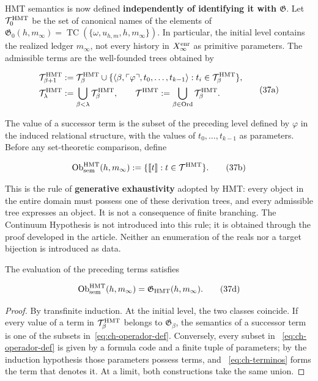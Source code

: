 HMT semantics is now defined \textbf{independently of identifying it with
\(\mathfrak G\)}. Let \(\mathcal T_0^{\rm HMT}\) be the set of canonical names
of the elements of
\(\mathfrak G_0(h,m_\infty)=
\operatorname{TC}(\{\omega,u_{h,m},h,m_\infty\})\). In particular, the
initial level contains the realized ledger \(m_\infty\), not every history
in \(X_\infty^{\rm enr}\) as primitive parameters. The admissible terms are
the well-founded trees obtained by

\[
 \begin{aligned}
 \mathcal T^{\rm HMT}_{\beta+1}
 &:={\mathcal T}^{\rm HMT}_\beta\cup
 \{\langle\beta,\ulcorner\varphi\urcorner,
       t_0,\ldots,t_{k-1}\rangle:
       t_i\in\mathcal T^{\rm HMT}_\beta\},\\
 \mathcal T^{\rm HMT}_\lambda&:=
       \bigcup_{\beta<\lambda}\mathcal T^{\rm HMT}_\beta,
 \qquad
 \mathcal T^{\rm HMT}:=
       \bigcup_{\beta\in\operatorname{Ord}}\mathcal T^{\rm HMT}_\beta.
 \end{aligned}
\tag{37a}\label{eq:ch-terminos}
\]

The value of a successor term is the subset of the preceding level defined by
\(\varphi\) in the induced relational structure, with the values of
\(t_0,\ldots,t_{k-1}\) as parameters. Before any set-theoretic comparison,
define

\[
 \operatorname{Ob}_{\rm sem}^{\rm HMT}(h,m_\infty)
 :=\{\llbracket t\rrbracket:t\in\mathcal T^{\rm HMT}\}.
\tag{37b}\label{eq:ch-objetos-semanticos}
\]

This is the rule of \textbf{generative exhaustivity} adopted by HMT: every
object in the entire domain must possess one of these derivation trees, and
every admissible tree expresses an object. It is not a consequence of finite
branching. The Continuum Hypothesis is not introduced into this rule; it is
obtained through the proof developed in the article. Neither an enumeration of
the reals nor a target bijection is introduced as data.

\begin{theorem}
\label{thm:ch-6a}
The evaluation of the preceding terms satisfies

\[
 \operatorname{Ob}_{\rm sem}^{\rm HMT}(h,m_\infty)
 =\mathfrak G_{\rm HMT}(h,m_\infty).
\tag{37d}\label{eq:ch-equivalencia-semantica}
\]

\end{theorem}
\begin{proof}
By transfinite induction. At the initial level, the two classes coincide. If
every value of a term in \(\mathcal T^{\rm HMT}_\beta\) belongs to
\(\mathfrak G_\beta\), the semantics of a successor term is one of the subsets
in~\eqref{eq:ch-operador-def}. Conversely, every subset in
~\eqref{eq:ch-operador-def} is given by a formula code and a finite tuple of
parameters; by the induction hypothesis those parameters possess terms, and
~\eqref{eq:ch-terminos} forms the term that denotes it. At a limit, both
constructions take the same union.
\end{proof}

